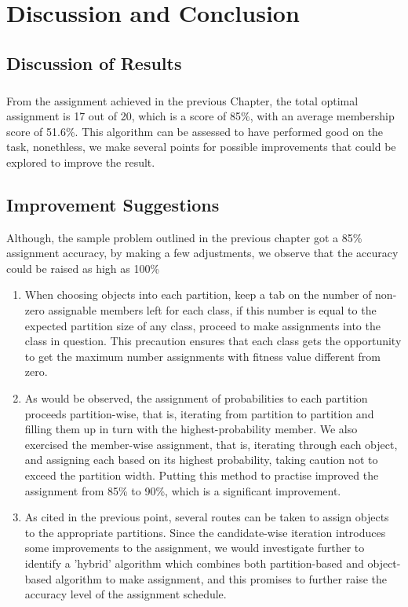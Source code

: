 \documentclass[a4paper,openany]{book}
\begin{document}
	\chapter{Discussion and Conclusion}
		\section{Discussion of Results}
			\paragraph{}
				From the assignment achieved in the previous Chapter, the total optimal assignment is 17 out of 20, which is a score of 85\%, with an average membership score of 51.6\%. This algorithm can be assessed to have performed good on the task, nonethless, we make several points for possible improvements that could be explored to improve the result.
		\section{Improvement Suggestions}
			Although, the sample problem outlined in the previous chapter got a 85\% assignment accuracy, by making a few adjustments, we observe that the accuracy could be raised as high as 100\%
			\begin{enumerate}
				\item When choosing objects into each partition, keep a tab on the number of non-zero assignable members left for each class, if this number is equal to the expected partition size of any class, proceed to make assignments into the class in question. This precaution ensures that each class gets the opportunity to get the maximum number assignments with fitness value different from zero.
				\item As would be observed, the assignment of probabilities to each partition proceeds partition-wise, that is, iterating from partition to partition and filling them up in turn with the highest-probability member. We also exercised the member-wise assignment, that is, iterating through each object, and assigning each based on its highest probability, taking caution not to exceed the partition width. Putting this method to practise improved the assignment from 85\% to 90\%, which is a significant improvement.
				\item As cited in the previous point, several routes can be taken to assign objects to the appropriate partitions. Since the candidate-wise iteration introduces some improvements to the assignment, we would investigate further to identify a 'hybrid' algorithm which combines both partition-based and object-based algorithm to make assignment, and this promises to further raise the accuracy level of the assignment schedule.
			\end{enumerate}
\end{document}

